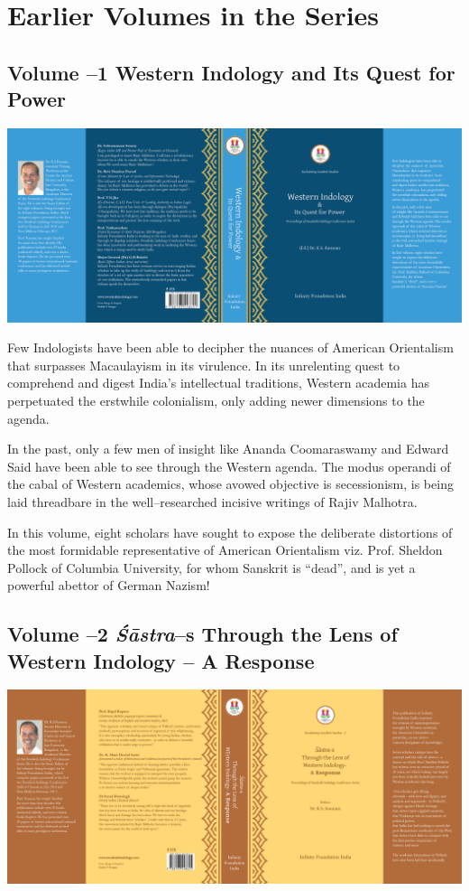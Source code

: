 
\chapter*{Earlier Volumes in the Series}

\section*{\num{Volume –1} Western Indology and Its Quest for Power}

\includegraphics{images/fig01.png}

Few Indologists have been able to decipher the nuances of American Orientalism that surpasses Macaulayism in its virulence. In its unrelenting quest to comprehend and digest India’s intellectual traditions, Western academia has perpetuated the erstwhile colonialism, only adding newer dimensions to the agenda. 

In the past, only a few men of insight like Ananda Coomaraswamy and Edward Said have been able to see through the Western agenda. The modus operandi of the cabal of Western academics, whose avowed objective is secessionism, is being laid threadbare in the well–researched incisive writings of Rajiv Malhotra.

In this volume, eight scholars have sought to expose the deliberate distortions of the most formidable representative of American Orientalism viz. Prof. Sheldon Pollock of Columbia University, for whom Sanskrit is “dead”, and is yet a powerful abettor of German Nazism!


\section*{\num{Volume –2} \textit{Śāstra}–s Through the Lens of Western Indology – A Response}

\includegraphics{images/fig02.png}

